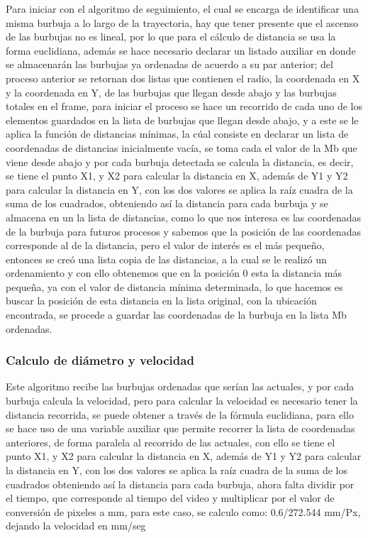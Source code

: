\documentclass[12pt,twocolumn,a4paper]{article}
\begin{document}
Para iniciar con el algoritmo de seguimiento, el cual se encarga de identificar una misma burbuja a lo largo de la trayectoria, hay que tener presente que el ascenso de las burbujas no es lineal, por lo que para el cálculo de distancia se usa la forma euclidiana, además se hace necesario declarar un listado auxiliar en donde se almacenarán las burbujas ya ordenadas de acuerdo a su par anterior; del proceso anterior se retornan dos listas que contienen el radio, la coordenada en X y la coordenada en Y, de las burbujas que llegan desde abajo y las burbujas totales en el frame,  para iniciar el proceso se hace un recorrido de cada uno de los elementos guardados en la lista de burbujas que llegan desde abajo, y a este se le aplica la función de distancias mínimas, la cúal consiste en declarar un lista de coordenadas de distancias inicialmente vacía, se toma cada el valor de la Mb que viene desde abajo y por cada burbuja detectada se calcula la distancia, es decir, se tiene el  punto X1, y X2 para calcular la distancia en X, además de Y1 y Y2 para calcular la distancia en Y, con los dos valores se aplica la raíz cuadra de la suma de los cuadrados,  obteniendo así la distancia para cada burbuja y se almacena en un la lista de distancias, como lo que nos interesa es las coordenadas de la burbuja para futuros procesos y sabemos que la posición de las coordenadas corresponde al de la distancia, pero el valor de interés es el más pequeño, entonces se creó una lista copia de las distancias, a la cual se le realizó un ordenamiento y con ello obtenemos que en la posición 0 esta la distancia más pequeña, ya con el valor de distancia mínima determinada, lo que hacemos es buscar la posición de esta distancia en la lista original, con la ubicación encontrada, se procede a guardar las coordenadas de la burbuja en la lista Mb ordenadas.


\subsubsection{Calculo de diámetro y velocidad }

Este algoritmo recibe las burbujas ordenadas que serían las actuales, y por cada burbuja calcula la velocidad, pero para calcular la velocidad es necesario tener la distancia recorrida, se puede obtener a través de la fórmula euclidiana, para ello se hace uso de una variable auxiliar que permite recorrer la lista de coordenadas anteriores, de forma paralela al recorrido de las actuales, con ello se tiene el  punto X1, y X2 para calcular la distancia en X, además de Y1 y Y2 para calcular la distancia en Y, con los dos valores se aplica la raíz cuadra de la suma de los cuadrados obteniendo así la distancia para cada burbuja, ahora falta dividir por el tiempo, que corresponde al tiempo del video y multiplicar por el valor de conversión de pixeles a mm, para este caso, se calculo como: 0.6/272.544 mm/Px, dejando la velocidad en mm/seg
\end{document}
